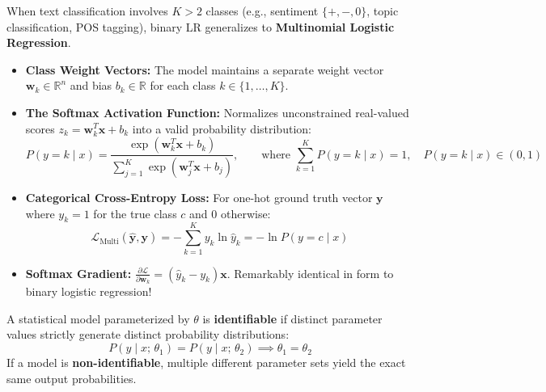 \documentclass[10pt,a4paper]{article}
\begin{document}

\par\vspace{1pt}
When text classification involves $K > 2$ classes (e.g., sentiment $\{+, -, 0\}$, topic classification, POS tagging), binary LR generalizes to \textbf{Multinomial Logistic Regression}.
\begin{itemize}[leftmargin=12pt, itemsep=0.5pt, parsep=0pt, topsep=0.5pt]
    \item \textbf{Class Weight Vectors:} The model maintains a separate weight vector $\mathbf{w}_k \in \mathbb{R}^n$ and bias $b_k \in \mathbb{R}$ for each class $k \in \{1, \dots, K\}$.
    \item \textbf{The Softmax Activation Function:} Normalizes unconstrained real-valued scores $z_k = \mathbf{w}_k^T \mathbf{x} + b_k$ into a valid probability distribution:
    \[
    P(y = k \mid x) = \frac{\exp(\mathbf{w}_k^T \mathbf{x} + b_k)}{\sum_{j=1}^K \exp(\mathbf{w}_j^T \mathbf{x} + b_j)}, \qquad \text{where } \sum_{k=1}^K P(y = k \mid x) = 1, \quad P(y = k \mid x) \in (0, 1)
    \]
    \item \textbf{Categorical Cross-Entropy Loss:} For one-hot ground truth vector $\mathbf{y}$ where $y_k = 1$ for the true class $c$ and $0$ otherwise:
    \[
    \mathcal{L}_{\text{Multi}}(\hat{\mathbf{y}}, \mathbf{y}) = -\sum_{k=1}^K y_k \ln \hat{y}_k = -\ln P(y = c \mid x)
    \]
    \item \textbf{Softmax Gradient:} $\frac{\partial \mathcal{L}}{\partial \mathbf{w}_k} = (\hat{y}_k - y_k) \mathbf{x}$. Remarkably identical in form to binary logistic regression!
\end{itemize}
\vspace{2pt}

\par\vspace{1pt}
\begin{theoremprompt}
\par\vspace{1pt}
A statistical model parameterized by $\theta$ is \textbf{identifiable} if distinct parameter values strictly generate distinct probability distributions:
\[
P(y \mid x;\, \theta_1) = P(y \mid x;\, \theta_2) \implies \theta_1 = \theta_2
\]
If a model is \textbf{non-identifiable}, multiple different parameter sets yield the exact same output probabilities.
\end{theoremprompt}
\vspace{1pt}
\end{document}
